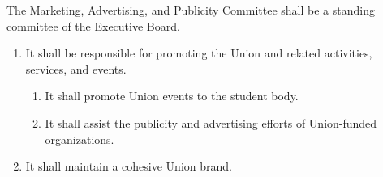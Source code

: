 \item The Marketing, Advertising, and Publicity Committee shall be a standing committee of the Executive Board.

\begin{enumerate}

    \item It shall be responsible for promoting the Union and related activities, services, and events.
    \begin{enumerate}
        \item It shall promote Union events to the student body.
        \item It shall assist the publicity and advertising efforts of Union-funded organizations.
    \end{enumerate}

    \item It shall maintain a cohesive Union brand.

\end{enumerate}
